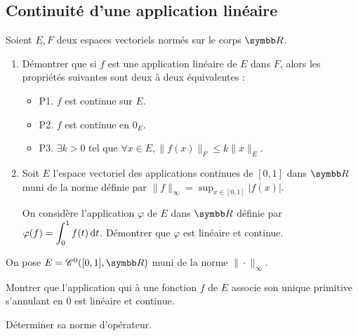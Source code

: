 \subsection{Continuité d'une application linéaire}
\begin{exercice}
    Soient $E, F$ deux espaces vectoriels normés sur le corps $\R$.
    \begin{enumerate}
        \item Démontrer que si $f$ est une application linéaire de $E$ dans $F$, alors les propriétés suivantes sont deux à deux équivalentes :
        \begin{itemize}
            \item P1. $f$ est continue sur $E$.
            \item P2. $f$ est continue en $0_{E}$.
            \item P3. $\exists k > 0$ tel que $\forall x \in E, \|f(x)\|_{F} \leqslant k \|x\|_{E}$.
        \end{itemize}
        \item Soit $E$ l'espace vectoriel des applications continues de $[0,1]$ 
            dans $\R$ muni de la norme définie par $\|f\|_{\infty} = \sup_{x \in [0,1]} |f(x)|$.

            On considère l'application $\varphi$ de $E$ dans $\R$ définie par $\displaystyle\varphi(f) = \int_{0}^{1} f(t) \,\mathrm{d}t$. 
            Démontrer que $\varphi$ est linéaire et continue.
    \end{enumerate}
\end{exercice}

\begin{exercice}
    On pose $E= \mathscr C^{0}([0,1], \R)$ muni de la norme $\|\cdot\|_{\infty}$.
    
    Montrer que l'application qui à une fonction $f$ de $E$ associe son unique primitive s'annulant en 0 est linéaire et continue. 

    Déterminer sa norme d'opérateur.
\end{exercice}

